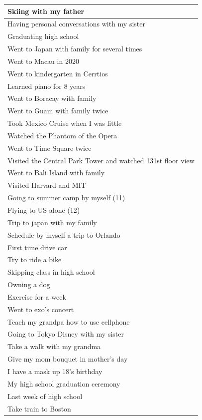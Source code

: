 \documentclass[
  .7em,
  letterpaper,
  DIV=11,
  numbers=noendperiod]{scrartcl}
\begin{document}
\begin{table}
\begin{tabular}{l}
\hline
Skiing with my father\\
\hline
Having personal conversations with my sister\\
\hline
Graduating high school\\
\hline
Went to Japan with family for several times\\
\hline
Went to Macau in 2020\\
\hline
Went to kindergarten in Cerrtios\\
\hline
Learned piano for 8 years\\
\hline
Went to Boracay with family\\
\hline
Went to Guam with family twice\\
\hline
Took Mexico Cruise when I was little\\
\hline
Watched the Phantom of the Opera\\
\hline
Went to Time Square twice\\
\hline
Visited the Central Park Tower and watched 131st floor view\\
\hline
Went to Bali Island with family\\
\hline
Visited Harvard and MIT\\
\hline
Going to summer camp by myself (11)\\
\hline
Flying to US alone (12)\\
\hline
Trip to japan with my family\\
\hline
Schedule by myself a trip to Orlando\\
\hline
First time drive car\\
\hline
Try to ride a bike\\
\hline
Skipping class in high school\\
\hline
Owning a dog\\
\hline
Exercise for a week\\
\hline
Went to exo's concert\\
\hline
Teach my grandpa how to use cellphone\\
\hline
Going to Tokyo Disney with my sister\\
\hline
Take a walk with my grandma\\
\hline
Give my mom bouquet in mother's day\\
\hline
I have a mask up 18's birthday\\
\hline
My high school graduation ceremony\\
\hline
Last week of high school\\
\hline
Take train to Boston\\

\end{tabular}
\end{table}
\end{document}
